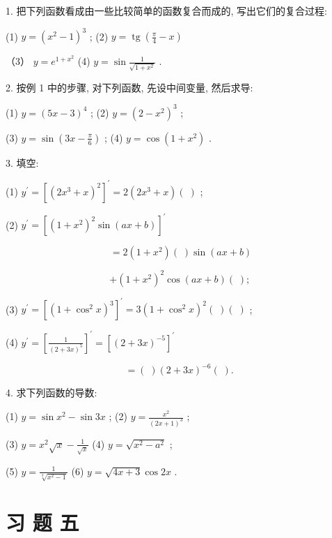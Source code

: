 \documentclass[10pt]{article}
\begin{document}
1. 把下列函数看成由一些比较简单的函数复合而成的, 写出它们的复合过程:

(1) \(y = {\left( {x}^{2} - 1\right) }^{3}\) ; (2) \(y = \operatorname{tg}\left( {\frac{\pi }{4} - x}\right)\)

（3） \(y = {e}^{1 + {x}^{2}}\) (4) \(y = \sin \frac{1}{\sqrt{1 + {x}^{2}}}\) .

2. 按例 1 中的步骤, 对下列函数, 先设中间变量, 然后求导:

(1) \(y = {\left( 5x - 3\right) }^{4}\) ; (2) \(y = {\left( 2 - {x}^{2}\right) }^{3}\) ;

(3) \(y = \sin \left( {{3x} - \frac{\pi }{6}}\right)\) ; (4) \(y = \cos \left( {1 + {x}^{2}}\right)\) .

3. 填空:

(1) \({y}^{\prime } = {\left\lbrack {\left( 2{x}^{3} + x\right) }^{2}\right\rbrack }^{\prime } = 2\left( {2{x}^{3} + x}\right) \left( \;\right)\) ;

(2) \({y}^{\prime } = {\left\lbrack {\left( 1 + {x}^{2}\right) }^{2}\sin \left( ax + b\right) \right\rbrack }^{\prime }\)

\[
= 2\left( {1 + {x}^{2}}\right) \left( \;\right) \sin \left( {{ax} + b}\right)
\]

\[
+ {\left( 1 + {x}^{2}\right) }^{2}\cos \left( {{ax} + b}\right) \left( \;\right) \text{; }
\]

(3) \({y}^{\prime } = {\left\lbrack {\left( 1 + {\cos }^{2}x\right) }^{3}\right\rbrack }^{\prime } = 3{\left( 1 + {\cos }^{2}x\right) }^{2}\left( \;\right) \left( \;\right)\) ;

(4) \({y}^{\prime } = {\left\lbrack \frac{1}{{\left( 2 + 3x\right) }^{5}}\right\rbrack }^{\prime } = {\left\lbrack {\left( 2 + 3x\right) }^{-5}\right\rbrack }^{\prime }\)

\[
= \left( \;\right) {\left( 2 + 3x\right) }^{-6}\left( \;\right) \text{. }
\]

4. 求下列函数的导数:

(1) \(y = \sin {x}^{2} - \sin {3x}\) ; (2) \(y = \frac{{x}^{2}}{{\left( 2x + 1\right) }^{3}}\) ;

(3) \(y = {x}^{2}\sqrt{x} - \frac{1}{\sqrt{x}}\) (4) \(y = \sqrt{{x}^{2} - {a}^{2}}\) ;

(5) \(y = \frac{1}{\sqrt[3]{{x}^{2} - 1}}\) (6) \(y = \sqrt{{4x} + 3}\cos {2x}\) .

\section*{习 题 五}
\end{document}
